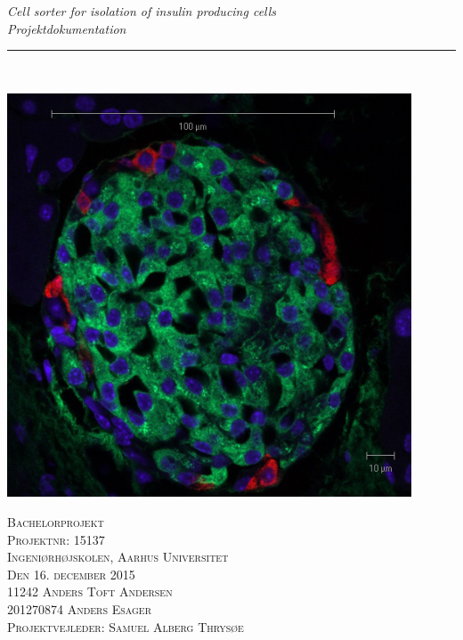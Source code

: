 \thispagestyle{empty}
\begin{center}
\vspace{3cm}

\phantom{hul}

\phantom{hul}

\phantom{hul}

\textsl{\LARGE Cell sorter for isolation of insulin producing cells} \\ \vspace{0.25cm}
\textsl{\Large Projektdokumentation} \\ %

\rule{13cm}{3mm} \\ \vspace{1cm}

\includegraphics[width=0.9\textwidth]{billeder/forside.jpg}

\textsc{\center Bachelorprojekt \\
Projektnr: 15137 \\
Ingeniørhøjskolen, Aarhus Universitet \\
Den 16. december 2015 \\ \vspace{1cm}
11242	Anders Toft Andersen \\
201270874	Anders Esager \\
Projektvejleder: Samuel Alberg Thrysøe \\}
\end{center}
